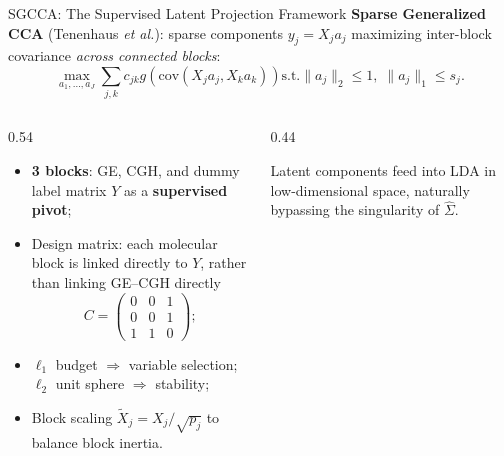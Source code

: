 \documentclass[aspectratio=169, 10pt]{beamer}
\def\quad{ }%
\begin{document}
\begin{frame}{SGCCA: The Supervised Latent Projection Framework}
  \textbf{Sparse Generalized CCA} (Tenenhaus \textit{et al.}): sparse components $y_j = X_j a_j$ maximizing inter-block covariance \textit{across connected blocks}:
  \[
    \max_{a_1, \dots, a_J} \sum_{j,k} c_{jk} g\left(\text{cov}(X_j a_j, X_k a_k)\right) \quad \text{s.t.} \quad \|a_j\|_2 \le 1, \; \|a_j\|_1 \le s_j.
  \]

  \begin{columns}[c]
    \begin{column}{0.54\textwidth}
      \begin{itemize}
        \item \textbf{3 blocks}: GE, CGH, and dummy label matrix $Y$ as a \textbf{supervised pivot};
        \item Design matrix: each molecular block is linked directly to $Y$, rather than linking GE--CGH directly
              \[
                C = \begin{pmatrix} 0 & 0 & 1 \\ 0 & 0 & 1 \\ 1 & 1 & 0 \end{pmatrix};
              \]
        \item $\ell_1$ budget $\Rightarrow$ variable selection; $\ell_2$ unit sphere $\Rightarrow$ stability;
        \item Block scaling $\tilde{X}_j = X_j / \sqrt{p_j}$ to balance block inertia.
      \end{itemize}
    \end{column}

    \begin{column}{0.44\textwidth}
      \centering
      \vskip 4pt
        {\footnotesize Latent components feed into LDA in low-dimensional space, naturally bypassing the singularity of $\hat{\Sigma}$.}
    \end{column}
  \end{columns}
\end{frame}
\end{document}
